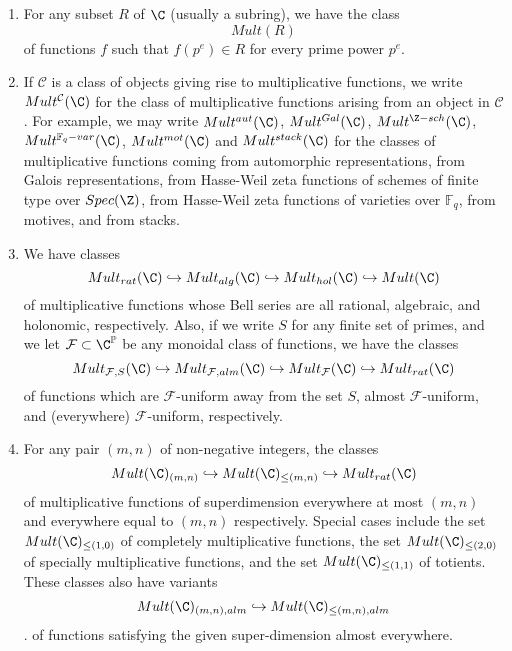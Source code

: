 \begin{enumerate}
\item For any subset $R$ of $\C$ (usually a subring), we have the class
$$Mult(R)$$ 
of functions $f$ such that $f(p^e) \in R$ for every prime power $p^e$. 
\item If $\mathcal{C}$ is a class of objects giving rise to multiplicative functions, we write $Mult^{\mathcal{C}}(\C)$ for the class of multiplicative functions arising from an object in $\mathcal{C}$. For example, we may write $Mult^{aut}(\C)$, $Mult^{Gal}(\C)$, $Mult^{\Z-sch}(\C)$, $Mult^{\mathbb{F}_q-var}(\C)$, $Mult^{mot}(\C)$ and $Mult^{stack}(\C)$ for the classes of multiplicative functions coming from automorphic representations, from Galois representations, from Hasse-Weil zeta functions of schemes of finite type over $Spec(\Z)$, from Hasse-Weil zeta functions of varieties over $\mathbb{F}_q$, from motives, and from stacks. 
\item We have classes 
$$Mult_{rat}(\C) \hookrightarrow Mult_{alg}(\C) \hookrightarrow Mult_{hol}(\C) \hookrightarrow Mult(\C) $$ 
of multiplicative functions whose Bell series are all rational, algebraic, and holonomic, respectively. Also, if we write $S$ for any finite set of primes, and we let $\mathcal{F} \subset \C^{\mathbb{P}}$ be any monoidal class of functions, we have the classes 
$$ Mult_{\mathcal{F}, S}(\C) \hookrightarrow Mult_{\mathcal{F}, alm}(\C) \hookrightarrow Mult_{\mathcal{F}}(\C)  \hookrightarrow Mult_{rat}(\C)   $$
of functions which are $\mathcal{F}$-uniform away from the set $S$, almost $\mathcal{F}$-uniform, and (everywhere) $\mathcal{F}$-uniform, respectively.
\item For any pair $(m, n)$ of non-negative integers, the classes
$$ Mult(\C)_{(m, n)} \hookrightarrow Mult(\C)_{\leq (m, n)}  \hookrightarrow Mult_{rat}(\C)$$
of multiplicative functions of superdimension everywhere at most $(m, n)$ and everywhere equal to $(m, n)$ respectively. Special cases include the set $Mult(\C)_{\leq (1, 0)}$ of completely multiplicative functions, the set $Mult(\C)_{\leq (2, 0)}$ of specially multiplicative functions, and the set $Mult(\C)_{\leq (1, 1)}$ of totients. These classes also have variants 
$$Mult(\C)_{(m, n), alm} \hookrightarrow Mult(\C)_{ \leq (m, n), alm}$$.
of functions satisfying the given super-dimension almost everywhere.


\end{enumerate}
